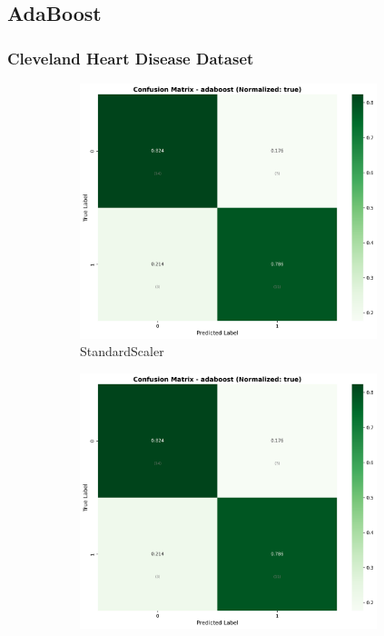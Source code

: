 \FloatBarrier

\subsection{AdaBoost}\label{subsec:adaboost}

\subsubsection{Cleveland Heart Disease Dataset}\label{subsubsec:adaboost-cleveland}

\begin{figure}[H]\centering
\begin{subfigure}[b]{0.31\textwidth}\centering
\includegraphics[width=0.95\textwidth]{Result/cleveland_dataset/confusion_matrices/adaboost_numeric_dataset_StandardScaler.png}
\caption{StandardScaler}\label{fig:adaboost_clev_cm_standard}
\end{subfigure}\hfill
\begin{subfigure}[b]{0.31\textwidth}\centering
\includegraphics[width=0.95\textwidth]{Result/cleveland_dataset/confusion_matrices/adaboost_numeric_dataset_MinMaxScaler.png}

\end{subfigure}
\end{figure}
